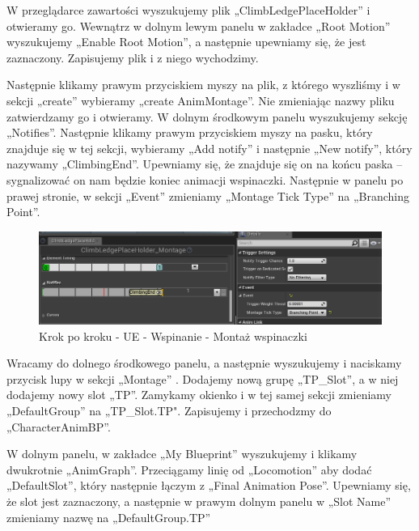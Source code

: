 \documentclass[12pt]{xmgr}
\begin{document}
W przeglądarce zawartości wyszukujemy plik „ClimbLedgePlaceHolder” i otwieramy go. Wewnątrz w dolnym lewym panelu w zakładce „Root Motion” wyszukujemy „Enable Root Motion”, a następnie upewniamy się, że jest zaznaczony. Zapisujemy plik i z niego wychodzimy. 

Następnie klikamy prawym przyciskiem myszy na plik, z którego wyszliśmy i w sekcji „create” wybieramy „create AnimMontage”. Nie zmieniając nazwy pliku zatwierdzamy go i otwieramy. W dolnym środkowym panelu wyszukujemy sekcję „Notifies”. Następnie klikamy prawym przyciskiem myszy na pasku, który znajduje się w tej sekcji, wybieramy „Add notify” i następnie „New notify”, który nazywamy „ClimbingEnd”. Upewniamy się, że znajduje się on na końcu paska – sygnalizować on nam będzie koniec animacji wspinaczki. Następnie w panelu po prawej stronie, w sekcji „Event” zmieniamy „Montage Tick Type” na „Branching Point”.

\begin{figure}[!htb]
    \begin{center}
    \includegraphics[scale=0.5]{Screeny/UeKrokPoKroku/MontageNotify}
    \end{center}
    \caption{Krok po kroku - UE - Wspinanie - Montaż wspinaczki}
\end{figure}

\newpage
Wracamy do dolnego środkowego panelu, a następnie wyszukujemy i naciskamy przycisk lupy w sekcji „Montage” . Dodajemy nową grupę „TP\_Slot”, a w niej dodajemy nowy slot „TP”. Zamykamy okienko i w tej samej sekcji zmieniamy „DefaultGroup” na „TP\_Slot.TP". Zapisujemy i przechodzmy do „CharacterAnimBP”.

W dolnym panelu, w zakładce „My Blueprint” wyszukujemy i klikamy dwukrotnie „AnimGraph”. Przeciągamy linię od „Locomotion” aby dodać „DefaultSlot”, który następnie łączym z „Final Animation Pose”.  Upewniamy się, że slot jest zaznaczony, a następnie w prawym dolnym panelu w „Slot Name” zmieniamy nazwę na „DefaultGroup.TP”
\end{document}
